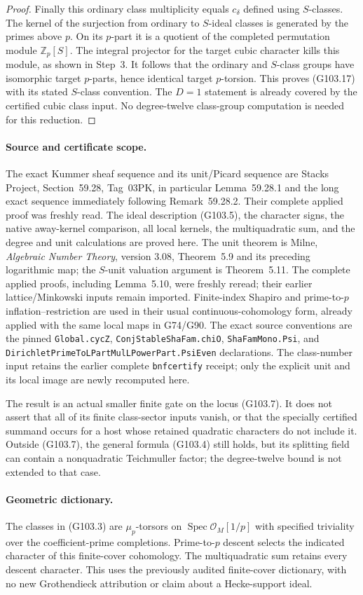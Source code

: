 \begin{proof}
Finally this ordinary class multiplicity equals $c_\delta$
defined using $S$-classes.
The kernel of the surjection from ordinary to $S$-ideal classes
is generated by the primes above $p$.
On its $p$-part it is a quotient of the completed permutation
module $\mathbb Z_p[S]$.
The integral projector for the target cubic character kills
this module, as shown in Step~3.
It follows that the ordinary and $S$-class groups have
isomorphic target $p$-parts, hence identical target $p$-torsion.
This proves (G103.17) with its stated $S$-class convention.
The $D=1$ statement is already covered by the certified cubic
class input.  No degree-twelve class-group computation is
needed for this reduction.
\end{proof}

\paragraph{Source and certificate scope.}
The exact Kummer sheaf sequence and its unit/Picard sequence are
Stacks Project, Section~59.28, Tag~03PK, in particular
Lemma~59.28.1 and the long exact sequence immediately following
Remark~59.28.2.  Their complete applied proof was freshly read.
The ideal description (G103.5), the character signs, the native
away-kernel comparison, all local kernels, the multiquadratic sum,
and the degree and unit calculations are proved here.
The unit theorem is Milne, \emph{Algebraic Number Theory},
version 3.08, Theorem~5.9 and its preceding logarithmic map;
the $S$-unit valuation argument is Theorem~5.11.
The complete applied proofs, including Lemma~5.10, were freshly
reread; their earlier lattice/Minkowski inputs remain imported.
Finite-index Shapiro and prime-to-$p$ inflation--restriction are
used in their usual continuous-cohomology form, already applied
with the same local maps in G74/G90.
The exact source conventions are the pinned
\texttt{Global.cycZ}, \texttt{ConjStableShaFam.chiO},
\texttt{ShaFamMono.Psi}, and
\texttt{DirichletPrimeToLPartMulLPowerPart.PsiEven} declarations.
The class-number input retains the earlier complete
\texttt{bnfcertify} receipt; only the explicit unit and its local
image are newly recomputed here.

The result is an actual smaller finite gate on the locus (G103.7).
It does not assert that all of its finite class-sector inputs
vanish, or that the specially certified summand occurs for a
host whose retained quadratic characters do not include it.
Outside (G103.7), the general formula (G103.4) still holds, but
its splitting field can contain a nonquadratic Teichmuller factor;
the degree-twelve bound is not extended to that case.

\paragraph{Geometric dictionary.}
The classes in (G103.3) are $\mu_p$-torsors on
$\operatorname{Spec}\mathcal O_M[1/p]$ with specified triviality
over the coefficient-prime completions.  Prime-to-$p$ descent
selects the indicated character of this finite-cover cohomology.
The multiquadratic sum retains every descent character.  This uses
the previously audited finite-cover dictionary, with no new
Grothendieck attribution or claim about a Hecke-support ideal.
